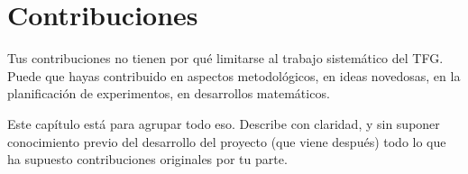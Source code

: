 \chapter{Contribuciones}
\label{ch:contribuciones}

Tus contribuciones no tienen por qué limitarse al trabajo sistemático del TFG.  Puede que hayas contribuido en aspectos metodológicos, en ideas novedosas, en la planificación de experimentos, en desarrollos matemáticos.

Este capítulo está para agrupar todo eso.  Describe con claridad, y sin suponer conocimiento previo del desarrollo del proyecto (que viene después) todo lo que ha supuesto contribuciones originales por tu parte.